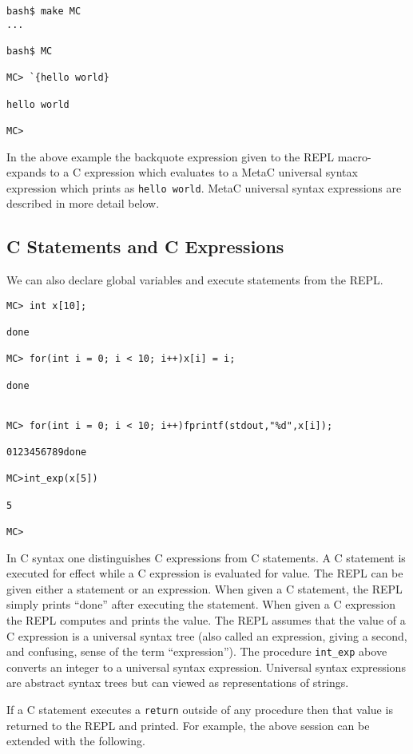 \documentclass{article}
\begin{document}
\begin{verbatim}
bash$ make MC
...

bash$ MC

MC> `{hello world}

hello world

MC>
\end{verbatim}

In the above example the backquote expression given to the REPL macro-expands to a C expression which evaluates to a
MetaC universal syntax  expression which prints as {\tt hello world}.
MetaC universal syntax expressions are described in more detail below.

\subsection{C Statements and C Expressions}

We can also declare global variables and execute statements from the REPL.

\begin{verbatim}
MC> int x[10];

done

MC> for(int i = 0; i < 10; i++)x[i] = i;

done


MC> for(int i = 0; i < 10; i++)fprintf(stdout,"%d",x[i]);

0123456789done

MC>int_exp(x[5])

5

MC>
\end{verbatim}

In C syntax one distinguishes C expressions from C statements.  A C
statement is executed for effect while a C expression is evaluated for
value. The REPL can be given either a statement or an expression.  When
given a C statement, the REPL simply prints ``done'' after executing
the statement.
When given a C expression the REPL computes and prints
the value.  The REPL assumes that the value of a C expression
is a universal syntax tree (also called an expression, giving a second, and confusing,
sense of the term ``expression''). The procedure {\tt int\_exp} above
converts an integer to a universal syntax expression.  Universal syntax expressions are abstract
syntax trees but can viewed as representations of strings.

If a C statement executes a {\tt return} outside of any
procedure then that value is returned to the REPL and printed.
For example, the above session can be extended with the following.
\end{document}
